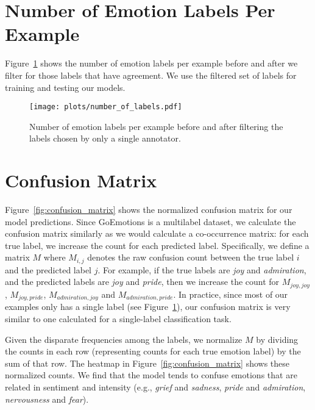 \documentclass[11pt,a4paper]{article}
\begin{document}
\section{Number of Emotion Labels Per Example}
\label{sec:modeling_plots}

Figure~\ref{fig:num_labels} shows the number of emotion labels per example before and after we filter for those labels that have agreement. We use the filtered set of labels for training and testing our models.

\begin{figure}[h]
 \centering
   \centering
   \texttt{[image: plots/number\_of\_labels.pdf]}
   \caption{Number of emotion labels per example before and after filtering the labels chosen by only a single annotator.}
   \label{fig:num_labels}
\end{figure}

\section{Confusion Matrix}
\label{sec:appendix_confusion_matrix}

Figure~\ref{fig:confusion_matrix} shows the normalized confusion matrix for our model predictions. Since GoEmotions is a multilabel dataset, we calculate the confusion matrix similarly as we would calculate a co-occurrence matrix: for each true label, we increase the count for each predicted label. Specifically, we define a matrix $M$ where $M_{i, j}$ denotes the raw confusion count between the true label $i$ and the predicted label $j$. For example, if the true labels are \emph{joy} and \emph{admiration}, and the predicted labels are \emph{joy} and \emph{pride}, then we increase the count for $M_{joy, joy}$, $M_{joy, pride}$, $M_{admiration, joy}$ and $M_{admiration, pride}$. In practice, since most of our examples only has a single label (see Figure~\ref{fig:num_labels}), our confusion matrix is very similar to one calculated for a single-label classification task.

Given the disparate frequencies among the labels, we normalize $M$ by dividing the counts in each row (representing counts for each true emotion label) by the sum of that row. The heatmap in Figure~\ref{fig:confusion_matrix} shows these normalized counts. We find that the model tends to confuse emotions that are related in sentiment and intensity (e.g., \emph{grief} and \emph{sadness}, \emph{pride} and \emph{admiration}, \emph{nervousness} and \emph{fear}).
\end{document}
